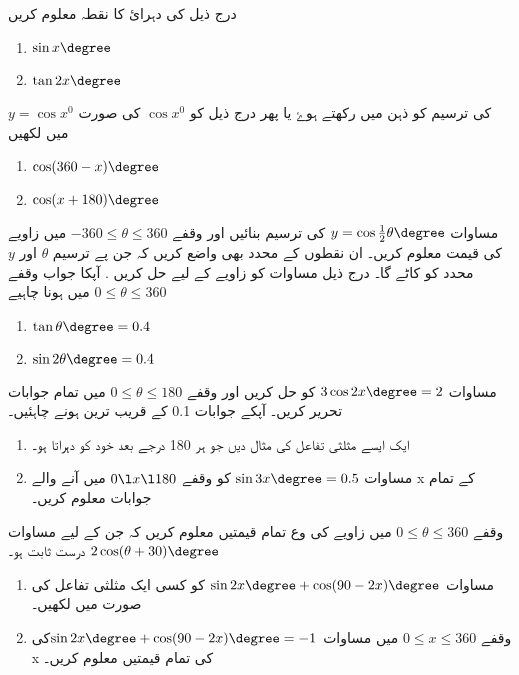 درج ذیل کی دہرائ کا نقطہ معلوم کریں
\begin{enumerate}
\item \(\sin x\degree\)
\item   \(\tan2x\degree \)
\end{enumerate}
\( y=\cos x^{0} \)
کی ترسیم کو ذہن میں رکھتے ہوۓ یا پھر درج ذیل کو \( \cos x^{0} \) کی صورت میں لکھیں 
\begin{enumerate}
\item  \(\cos(360-x)\degree \)
\item    \(\cos(x+180)\degree \)
\end{enumerate}
مساوات \(y=\cos\frac{1}{2}\theta\degree \) کی ترسیم بنائیں اور وقفے \(-360\le \theta\le 360\) میں زاویے کی قیمت معلوم کریں۔ ان نقطوں کے محدد بھی واضع کریں کہ جن پے ترسیم  \( \theta   \) اور \(   y \) محدد کو کاٹے گا۔
درج ذیل مساوات کو زاویے کے لیے حل کریں . آپکا جواب وقفے \(0\le \theta\le 360\) میں ہونا چاہیے 

\begin {enumerate}
\item  \(\tan\theta\degree=0.4 \)
\item    \(\sin2\theta\degree=0.4\)
\end{enumerate}



مساوات \(3\cos2x\degree=2 \) کو حل کریں اور وقفے \(0\le \theta\le 180\) میں تمام جوابات تحریر کریں۔ آپکے جوابات 0.1 کے قریب ترین ہونے چاہئیں۔
\begin{enumerate}
\item
ایک ایسے مثلثی تفاعل کی مثال دیں جو ہر 180 درجے بعد خود کو دہراتا ہو۔
\item
مساوات  \(\sin3x\degree=0.5 \) کو  وقفے \(0\l x\l 180\) میں آنے والے   x کے تمام جوابات معلوم کریں۔
\end{enumerate}
وقفے \(0\leq\theta\leq360\) میں زاویے کی وع تمام قیمتیں معلوم کریں کہ جن کے لیے مساوات  \(2\cos(\theta+30)\degree \) درست ثابت ہو۔
\begin{enumerate}
\item
مساوات \(\sin2x\degree+\cos(90-2x)\degree \) کو کسی ایک مثلثی تفاعل کی صورت میں لکھیں۔
\item
وقفے \(0\leq x \leq360\) میں مساوات \(\sin2x\degree+\cos(90-2x)\degree =-1\)کی  x کی تمام قیمتیں معلوم کریں۔

\end{enumerate}

